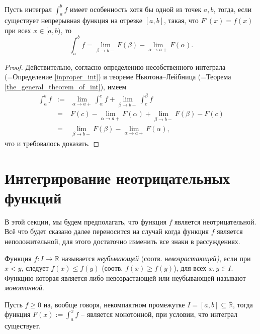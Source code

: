\begin{theorem}
    Пусть интеграл $\int_a^b f$ имеет особенность хотя бы одной из точек $a,b$, тогда, если существует непрерывная функция на отрезке $[a,b]$, такая, что $F'(x) = f(x)$ при всех $x \in [a,b)$, то
    \[
     \int_a^b f = \lim_{\beta \to b-}F(\beta)- \lim_{\alpha \to a+} F(\alpha).
    \]
\end{theorem}
\begin{proof}
    Действительно, согласно определению несобственного интеграла (=Определение \ref{inproper_int}) и теореме Ньютона--Лейбница (=Теорема \ref{the_general_theorem_of_int}), имеем
    \begin{eqnarray*}
        \int_a^b f &:=& \lim_{\alpha \to a+} \int_\alpha^cf + \lim_{\beta \to b-} \int_c^\beta f \\
        &=& F(c) - \lim_{\alpha \to a+} F(\alpha) + \lim_{\beta \to b-}F(\beta) - F(c) \\
        &=& \lim_{\beta \to b-}F(\beta)- \lim_{\alpha \to a+} F(\alpha),
    \end{eqnarray*}
    что и требовалось доказать.    
\end{proof}


\section{Интегрирование неотрицательных функций}

В этой секции, мы будем предполагать, что функция $f$ является неотрицательной. Всё что будет сказано далее переносится на случай когда функция $f$ является неположительной, для этого достаточно изменить все знаки в рассуждениях.

\begin{definition}
 Функция $f:I \to \mathbb{R}$ называется \textit{неубывающей} (соотв. \textit{невозрастающей)}, если при $x<y$, следует $f(x) \le f(y)$ (соотв. $f(x) \ge f(y)$), для всех $x,y \in I.$ Функцию которая является либо невозрастающей или неубывающей называют \textit{монотонной}. 
\end{definition}


\begin{claim}\label{int=monotonic}
 Пусть $f \ge 0$ на, вообще говоря, некомпактном промежутке $I = [a,b] \subseteq \overline{\mathbb{R}}$, тогда функция $F(x):=\int_a^x f$ -- является монотонной, при условии, что интеграл существует.    
\end{claim}

